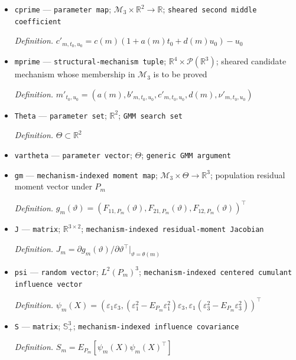 \documentclass{article}
\begin{document}
\begin{itemize}
  \par\smallskip\noindent\emph{Definition.} \(b'_{m,t_0,u_0}=b(m)(1+a(m)t_0+d(m)u_0)-t_0\)
  \item \texttt{cprime} --- \texttt{parameter map}; \(\mathcal M_3\times\mathbb R^2\to\mathbb R\); \texttt{sheared second middle coefficient}
  \par\smallskip\noindent\emph{Definition.} \(c'_{m,t_0,u_0}=c(m)(1+a(m)t_0+d(m)u_0)-u_0\)
  \item \texttt{mprime} --- \texttt{structural-\allowbreak{}mechanism tuple}; \(\mathbb R^4\times\mathcal P(\mathbb R^3)\); sheared candidate mechanism whose membership in \(\mathcal M_3\) is to be proved
  \par\smallskip\noindent\emph{Definition.} \(m'_{t_0,u_0}=(a(m),b'_{m,t_0,u_0},c'_{m,t_0,u_0},d(m),\nu'_{m,t_0,u_0})\)
  \item \texttt{Theta} --- \texttt{parameter set}; \(\mathbb R^2\); \texttt{GMM search set}
  \par\smallskip\noindent\emph{Definition.} \(\Theta\subset\mathbb R^2\)
  \item \texttt{vartheta} --- \texttt{parameter vector}; \(\Theta\); \texttt{generic GMM argument}
  \item \texttt{gm} --- \texttt{mechanism-\allowbreak{}indexed moment map}; \(\mathcal M_3\times\Theta\to\mathbb R^3\); population residual moment vector under \(P_m\)
  \par\smallskip\noindent\emph{Definition.} \(g_m(\vartheta)=(F_{11,P_m}(\vartheta),F_{21,P_m}(\vartheta),F_{12,P_m}(\vartheta))^\top\)
  \item \texttt{J} --- \texttt{matrix}; \(\mathbb R^{3\times2}\); \texttt{mechanism-\allowbreak{}indexed residual-\allowbreak{}moment Jacobian}
  \par\smallskip\noindent\emph{Definition.} \(J_m=\partial g_m(\vartheta)/\partial\vartheta^\top\vert_{\vartheta=\theta(m)}\)
  \item \texttt{psi} --- \texttt{random vector}; \(L^2(P_m)^3\); \texttt{mechanism-\allowbreak{}indexed centered cumulant influence vector}
  \par\smallskip\noindent\emph{Definition.} \(\psi_m(X)=(\varepsilon_1\varepsilon_3,(\varepsilon_1^2-E_{P_m}\varepsilon_1^2)\varepsilon_3,\varepsilon_1(\varepsilon_3^2-E_{P_m}\varepsilon_3^2))^\top\)
  \item \texttt{S} --- \texttt{matrix}; \(\mathbb S_+^3\); \texttt{mechanism-\allowbreak{}indexed influence covariance}
  \par\smallskip\noindent\emph{Definition.} \(S_m=E_{P_m}[\psi_m(X)\psi_m(X)^\top]\)

\end{itemize}
\end{document}
